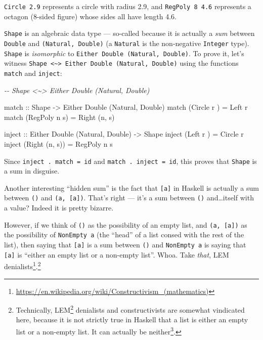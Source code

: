 \documentclass[]{article}
\newenvironment{Shaded}{}{}
\newcommand{\CommentTok}[1]{\textcolor[rgb]{0.38,0.63,0.69}{\textit{#1}}}
\newcommand{\DataTypeTok}[1]{\textcolor[rgb]{0.56,0.13,0.00}{#1}}
\newcommand{\NormalTok}[1]{#1}
\newcommand{\OtherTok}[1]{\textcolor[rgb]{0.00,0.44,0.13}{#1}}
\renewcommand{\href}[2]{#2\footnote{\url{#1}}}
\begin{document}
\texttt{Circle\ 2.9} represents a circle with radius 2.9, and
\texttt{RegPoly\ 8\ 4.6} represents a octagon (8-sided figure) whose sides all
have length 4.6.

\texttt{Shape} is an algebraic data type --- so-called because it is actually a
\emph{sum} between \texttt{Double} and \texttt{(Natural,\ Double)} (a
\texttt{Natural} is the non-negative \texttt{Integer} type). \texttt{Shape} is
\emph{isomorphic} to \texttt{Either\ Double\ (Natural,\ Double)}. To prove it,
let's witness
\texttt{Shape\ \textless{}\textasciitilde{}\textgreater{}\ Either\ Double\ (Natural,\ Double)}
using the functions \texttt{match} and \texttt{inject}:

\begin{Shaded}
\begin{Highlighting}[]
\CommentTok{{-}{-} Shape \textless{}\textasciitilde{}\textgreater{} Either Double (Natural, Double)}

\OtherTok{match ::} \DataTypeTok{Shape} \OtherTok{{-}\textgreater{}} \DataTypeTok{Either} \DataTypeTok{Double}\NormalTok{ (}\DataTypeTok{Natural}\NormalTok{, }\DataTypeTok{Double}\NormalTok{)}
\NormalTok{match (}\DataTypeTok{Circle}\NormalTok{  r  ) }\OtherTok{=} \DataTypeTok{Left}\NormalTok{ r}
\NormalTok{match (}\DataTypeTok{RegPoly}\NormalTok{ n s) }\OtherTok{=} \DataTypeTok{Right}\NormalTok{ (n, s)}

\OtherTok{inject ::} \DataTypeTok{Either} \DataTypeTok{Double}\NormalTok{ (}\DataTypeTok{Natural}\NormalTok{, }\DataTypeTok{Double}\NormalTok{) }\OtherTok{{-}\textgreater{}} \DataTypeTok{Shape}
\NormalTok{inject (}\DataTypeTok{Left}\NormalTok{   r    ) }\OtherTok{=} \DataTypeTok{Circle}\NormalTok{  r}
\NormalTok{inject (}\DataTypeTok{Right}\NormalTok{ (n, s)) }\OtherTok{=} \DataTypeTok{RegPoly}\NormalTok{ n s}
\end{Highlighting}
\end{Shaded}

Since \texttt{inject\ .\ match\ =\ id} and \texttt{match\ .\ inject\ =\ id},
this proves that \texttt{Shape} is a sum in disguise.

Another interesting ``hidden sum'' is the fact that \texttt{{[}a{]}} in Haskell
is actually a sum between \texttt{()} and \texttt{(a,\ {[}a{]})}. That's right
--- it's a sum between \texttt{()} and\ldots itself with a value? Indeed it is
pretty bizarre.

However, if we think of \texttt{()} as the possibility of an empty list, and
\texttt{(a,\ {[}a{]})} as the possibility of \texttt{NonEmpty\ a} (the ``head''
of a list consed with the rest of the list), then saying that \texttt{{[}a{]}}
is a sum between \texttt{()} and \texttt{NonEmpty\ a} is saying that
\texttt{{[}a{]}} is ``either an empty list or a non-empty list''. Whoa. Take
\emph{that},
\href{https://en.wikipedia.org/wiki/Constructivism_(mathematics)}{LEM
denialists}.\footnote{Technically,
  \href{https://en.wikipedia.org/wiki/Law_of_excluded_middle}{LEM} denialists
  and constructivists are somewhat vindicated here, because it is not strictly
  true in Haskell that a list is either an empty list or a non-empty list. It
  can actually \href{https://wiki.haskell.org/Bottom}{be neither}.}
\end{document}
